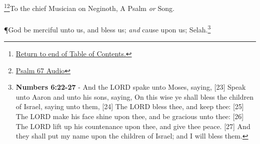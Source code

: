 \footnote{\textcolor[rgb]{0.00,0.25,0.00}{\hyperlink{TOC}{Return to end of Table of Contents.}}}\footnote{\href{https://audiobible.com/bible/psalms_67.html}{\textcolor[cmyk]{0.99998,1,0,0}{Psalm 67 Audio}}}\textcolor[cmyk]{0.99998,1,0,0}{To the chief Musician on Neginoth, A Psalm \emph{or} Song.}\\
\\
\P  \textcolor[cmyk]{0.99998,1,0,0}{God be merciful unto us, and bless us; \emph{and} cause  upon us; Selah.}\footnote{\textbf{Numbers 6:22-27} - And the LORD spake unto Moses, saying, [23] Speak unto Aaron and unto his sons, saying, On this wise ye shall bless the children of Israel, saying unto them, [24] The LORD bless thee, and keep thee: [25] The LORD make his face shine upon thee, and be gracious unto thee: [26] The LORD lift up his countenance upon thee, and give thee peace. [27] And they shall put my name upon the children of Israel; and I will bless them.}%
